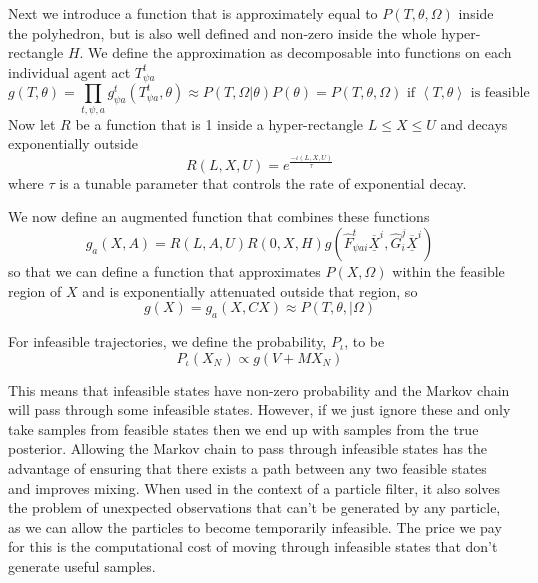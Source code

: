 \documentclass{article}
\begin{document}
Next we introduce a function that is approximately equal to $P(T,\theta,\Omega)$ inside the polyhedron, but is also well defined and non-zero inside the whole hyper-rectangle $H$. We define the approximation as decomposable into functions on each individual agent act $T^t_{\psi a}$
\[
g(T,\theta) = \prod_{t,\psi,a} g^t_{\psi a}(T^t_{\psi a},\theta) \approx P(T,\Omega|\theta)P(\theta) = P(T,\theta,\Omega) \text{ if }\left<T,\theta\right>\text{ is feasible}
\]
Now let $R$ be a function that is 1 inside a hyper-rectangle $L \le X \le U$ and decays exponentially outside
\[
R(L,X,U) = e^{\frac{-\iota(L,X,U)}{\tau}}
\]
where $\tau$ is a tunable parameter that controls the rate of exponential decay.

We now define an augmented function that combines these functions
\begin{equation}
g_a(X,A) = R\left(L,A,U\right)R(0,X,H)g\left(\hat{F}^t_{\psi a i}\overline{\underline{X}}^i, \hat{G}^j_i\overline{\underline{X}}^i\right)
\label{augmentedG}
\end{equation}
so that we can define a function that approximates $P(X,\Omega)$ within the feasible region of $X$ and is exponentially attenuated outside that region, so 
\[
g(X) = g_a\left(X,CX\right) \approx P(T,\theta,|\Omega)
\]

For infeasible trajectories, we define the probability, $P_\iota$, to be
\begin{equation}
P_\iota(X_N) \propto g(V+MX_N)
\label{loglinprob}
\end{equation}

This means that infeasible states have non-zero probability and the Markov chain will pass through some infeasible states.  However, if we just ignore these and only take samples from feasible states then we end up with samples from the true posterior. Allowing the Markov chain to pass through infeasible states has the advantage of ensuring that there exists a path between any two feasible states and improves mixing. When used in the context of a particle filter, it also solves the problem of unexpected observations that can't be generated by any particle, as we can allow the particles to become temporarily infeasible. The price we pay for this is the computational cost of moving through infeasible states that don't generate useful samples.
\end{document}
